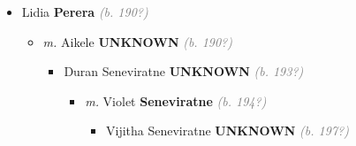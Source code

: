 \documentclass[10pt, openany]{book}
\begin{document}
\begin{itemize}
{\begin{itemize}
{\begin{itemize}
{\begin{itemize}
{\begin{itemize}
{\begin{itemize}
{\begin{itemize}
\item{\textit{m.} Stella Rodrigo \textbf{Navala} \textcolor{gray}{\textit{(b. 194?)}}   \label{couple:00003232:00003233} \begin{itemize}
\item{Sanjeeve Alexis Udunuwara Uruladeniya Koralage Senior Planter \textbf{Perera} \textcolor{gray}{\textit{(b. 197?)}}
       }
\item{Rushika \textbf{Perera} \textcolor{gray}{\textit{(b. 197?)}}
 }
\item{Sharnali \textbf{Perera} \textcolor{gray}{\textit{(b. 198?)}}
 }
\end{itemize}}
\end{itemize}
  }
\item{Chitra \textbf{Perera} \textcolor{gray}{\textit{(b. 194?)}}
 }
\item{George  \textbf{Perera} \textcolor{gray}{\textit{(b. 194?)}}
 }
\end{itemize}}
\end{itemize}
  }
\item{Lidia  \textbf{Perera} \textcolor{gray}{\textit{(b. 190?)}}
\begin{itemize}
\item{\textit{m.} Aikele \textbf{UNKNOWN} \textcolor{gray}{\textit{(b. 190?)}}   \label{couple:00003220:00003221} \begin{itemize}
\item{Duran Seneviratne \textbf{UNKNOWN} \textcolor{gray}{\textit{(b. 193?)}}
\begin{itemize}
\item{\textit{m.} Violet \textbf{Seneviratne} \textcolor{gray}{\textit{(b. 194?)}}   \label{couple:00003222:00003223} \begin{itemize}
\item{Vijitha Seneviratne \textbf{UNKNOWN} \textcolor{gray}{\textit{(b. 197?)}}
  }
\end{itemize}}
\end{itemize}
  }
\end{itemize}}
\end{itemize}
 }

\end{itemize}}
\end{itemize}}
\end{itemize}}
\end{itemize}
\end{document}
